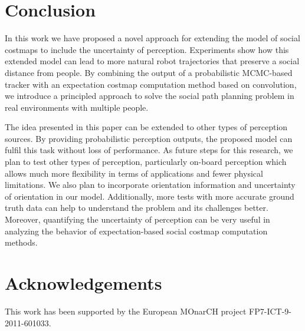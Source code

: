 \section{Conclusion}
\label{sec:conclusion}

In this work we have proposed a novel approach for extending the model of social costmaps to include the uncertainty of perception. Experiments show how this extended model can lead to more natural robot trajectories that preserve a social distance from people. By combining the output of a probabilistic MCMC-based tracker with an expectation costmap computation method based on convolution, we introduce a principled approach to solve the social path planning problem in real environments with multiple people. 

The idea presented in this paper can be extended to other types of perception sources. By providing probabilistic perception outputs, the proposed model can fulfil this task without loss of performance. As future steps for this research, we plan to test other types of perception, particularly on-board perception which allows much more flexibility in terms of applications and fewer physical limitations. We also plan to incorporate orientation information and uncertainty of orientation in our model. Additionally, more tests with more accurate ground truth data can help to understand the problem and its challenges better. Moreover, quantifying the uncertainty of perception can be very useful in analyzing the behavior of expectation-based social costmap computation methods.  


\section*{Acknowledgements}

This work has been supported by the European MOnarCH project FP7-ICT-9-2011-601033. 